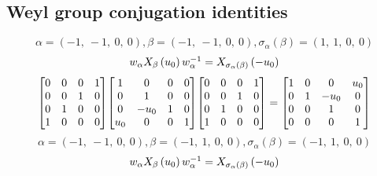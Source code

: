 \documentclass[11pt]{article}
\theoremstyle{definition}
\begin{document}
\subsection{Weyl group conjugation identities}

\providecommand{\scaletoalign}[2]{%
  \sbox0{$#2$}%
  \ifdim\wd0>#1\relax 
    \resizebox{#1}{!}{\usebox0}%
  \else 
    \usebox0%
  \fi 
}
\[
\alpha = \left( -1, \  -1, \  0, \  0\right), \beta = \left( -1, \  -1, \  0, \  0\right), \sigma_{\alpha}(\beta) = \left( 1, \  1, \  0, \  0\right)
\]
\[
\scaletoalign{\textwidth}{w_{\alpha} X_{\beta}\left(u_{0}\right) w_{\alpha}^{-1} = X_{\sigma_{\alpha}\left(\beta\right)}\left(- u_{0}\right)}
\]
\[
\scaletoalign{\textwidth}{{\left[\begin{matrix}0 & 0 & 0 & 1\\0 & 0 & 1 & 0\\0 & 1 & 0 & 0\\1 & 0 & 0 & 0\end{matrix}\right]} {\left[\begin{matrix}1 & 0 & 0 & 0\\0 & 1 & 0 & 0\\0 & - u_{0} & 1 & 0\\u_{0} & 0 & 0 & 1\end{matrix}\right]} {\left[\begin{matrix}0 & 0 & 0 & 1\\0 & 0 & 1 & 0\\0 & 1 & 0 & 0\\1 & 0 & 0 & 0\end{matrix}\right]} = {\left[\begin{matrix}1 & 0 & 0 & u_{0}\\0 & 1 & - u_{0} & 0\\0 & 0 & 1 & 0\\0 & 0 & 0 & 1\end{matrix}\right]}}
\]
\[
\alpha = \left( -1, \  -1, \  0, \  0\right), \beta = \left( -1, \  1, \  0, \  0\right), \sigma_{\alpha}(\beta) = \left( -1, \  1, \  0, \  0\right)
\]
\[
\scaletoalign{\textwidth}{w_{\alpha} X_{\beta}\left(u_{0}\right) w_{\alpha}^{-1} = X_{\sigma_{\alpha}\left(\beta\right)}\left(- u_{0}\right)}
\]
\end{document}
